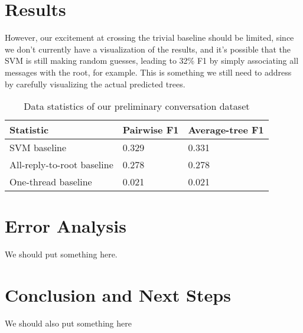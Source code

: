 \documentclass[10pt]{article}
\begin{document}
\section{Results}
\label{sec:results}
However, our excitement at crossing the trivial baseline should be limited,
since we don't currently have a visualization of the results, and it's
possible that the SVM is still making random guesses, leading to 32\% F1 by
simply associating all messages with the root, for example. This is something
we still need to address by carefully visualizing the actual predicted trees.

\begin{table}[h]\footnotesize
 \begin{tabular}{| l | l | l |} 
   \hline
   \textbf{Statistic} & Pairwise F1 & Average-tree F1 \\
   \hline
    SVM baseline & 0.329 & 0.331 \\
    All-reply-to-root baseline & 0.278 & 0.278 \\
    One-thread baseline & 0.021 & 0.021 \\
   \hline
  \end{tabular}
  \caption{Data statistics of our preliminary conversation dataset}
  \label{table:results}
\end{table}

\section{Error Analysis}
We should put something here.

\section{Conclusion and Next Steps}
We should also put something here


{} 

\end{document}
